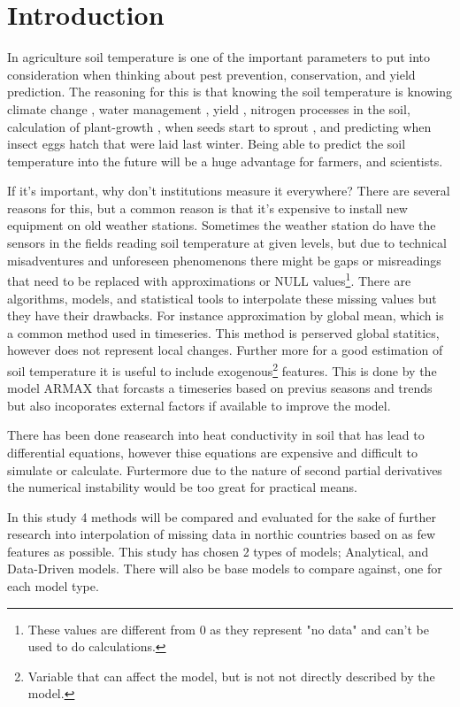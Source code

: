 \section{Introduction}

In agriculture soil temperature is one of the important parameters to put into consideration when thinking about pest prevention, conservation, and yield prediction. The reasoning for this is that knowing the soil temperature is knowing climate change \cite{li_attention-aware_2022}, water management \cite{alizamir_advanced_2020}, yield \cite{sim_prediction_2020}, nitrogen processes \cite{rankinen_simple_2004} in the soil, calculation of plant-growth \cite{li_modeling_2020}, when seeds start to sprout \cite{li_modeling_2020}, and predicting when insect eggs hatch that were laid last winter. Being able to predict the soil temperature into the future will be a huge advantage for farmers, and scientists.

If it's important, why don't institutions measure it everywhere? There are several reasons for this, but a common reason is that it's expensive to install new equipment on old weather stations. Sometimes the weather station do have the sensors in the fields reading soil temperature at given levels, but due to technical misadventures and unforeseen phenomenons there might be gaps or misreadings that need to be replaced with approximations or NULL values\footnote{These values are different from 0 as they represent "no data" and can't be used to do calculations.}. There are algorithms, models, and statistical tools to interpolate these missing values but they have their drawbacks. For instance approximation by global mean, which is a common method used in timeseries\cite{lepot_interpolation_2017}. This method is perserved global statitics, however does not represent local changes. Further more for a good estimation of soil temperature it is useful to include exogenous\footnote{Variable that can affect the model, but is not not directly described by the model.} features. This is done by the model ARMAX that forcasts a timeseries based on previus seasons and trends but also incoporates external factors if available to improve the model. 

There has been done reasearch into heat conductivity in soil that has lead to differential equations\cite{karvonen_model_1988}, however thise equations\cite{fourier_analytical_2009,karvonen_model_1988} are expensive and difficult to simulate or calculate\cite{rankinen_simple_2004}. Furtermore due to the nature of second partial derivatives the numerical instability would be too great for practical means.

In this study 4 methods will be compared and evaluated for the sake of further research into interpolation of missing data in northic countries based on as few features as possible. This study has chosen 2 types of models; Analytical, and Data-Driven models. There will also be base models to compare against, one for each model type. 